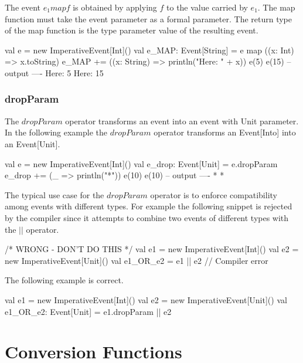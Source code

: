 \documentclass[10pt,a4paper]{article}
\newcommand{\code}[1]{{\fontfamily{cmtt}\small\selectfont#1}}
\begin{document}
The event $e_1 map f$ is obtained by applying $f$ to the value carried
by $e_1$. The map function must take the event parameter as a formal
parameter. The return type of the map function is the type parameter
value of the resulting event.

\begin{codenv}
val e = new ImperativeEvent[Int]()
val e_MAP: Event[String] = e map ((x: Int) => x.toString) 
e_MAP += ((x: String) => println("Here: " + x))
e(5)
e(15)
-- output ----
Here: 5
Here: 15
\end{codenv}




\subsubsection{dropParam}

The $dropParam$ operator transforms an event into an event with
\code{Unit} parameter. In the following example the $dropParam$
operator transforms an \code{Event[Into]} into an \code{Event[Unit]}.

\begin{codenv}
val e = new ImperativeEvent[Int]()
val e_drop: Event[Unit] = e.dropParam  
e_drop += (_ => println("*"))
e(10)
e(10)
-- output ----
*
*
\end{codenv}

The typical use case for the $dropParam$ operator is to enforce
compatibility among events with different types. For example the
following snippet is rejected by the compiler since it attempts to
combine two events of different types with the $||$ operator.

\begin{codenv}     /* WRONG - DON'T DO THIS */
val e1 = new ImperativeEvent[Int]()
val e2 = new ImperativeEvent[Unit]()
val e1_OR_e2 = e1 || e2  // Compiler error
\end{codenv}

The following example is correct.

\begin{codenv}
val e1 = new ImperativeEvent[Int]()
val e2 = new ImperativeEvent[Unit]()
val e1_OR_e2: Event[Unit] = e1.dropParam || e2
\end{codenv}



\newpage



\section{Conversion Functions}\label{sec:conv-fun}
\end{document}
